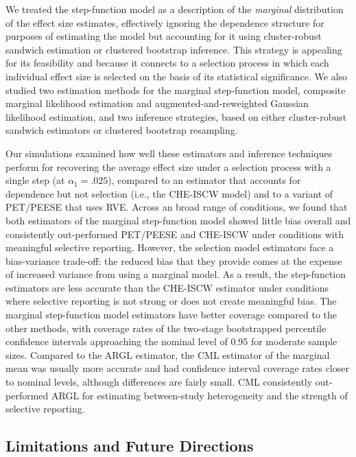 \documentclass[
  american,
  man, donotrepeattitle,floatsintext]{apa7}
\begin{document}
We treated the step-function model as a description of the \emph{marginal} distribution of the effect size estimates, effectively ignoring the dependence structure for purposes of estimating the model but accounting for it using cluster-robust sandwich estimation or clustered bootstrap inference.
This strategy is appealing for its feasibility and because it connects to a selection process in which each individual effect size is selected on the basis of its statistical significance.
We also studied two estimation methods for the marginal step-function model, composite marginal likelihood estimation and augmented-and-reweighted Gaussian likelihood estimation, and two inference strategies, based on either cluster-robust sandwich estimators or clustered bootstrap resampling.

Our simulations examined how well these estimators and inference techniques perform for recovering the average effect size under a selection process with a single step (at \(\alpha_1 = .025\)), compared to an estimator that accounts for dependence but not selection (i.e., the CHE-ISCW model) and to a variant of PET/PEESE that uses RVE.
Across an broad range of conditions, we found that both estimators of the marginal step-function model showed little bias overall and consistently out-performed PET/PEESE and CHE-ISCW under conditions with meaningful selective reporting.
However, the selection model estimators face a bias-variance trade-off:
the reduced bias that they provide comes at the expense of increased variance from using a marginal model. As a result, the step-function estimators are less accurate than the CHE-ISCW estimator under conditions where selective reporting is not strong or does not create meaningful bias.
The marginal step-function model estimators have better coverage compared to the other methods, with coverage rates of the two-stage bootstrapped percentile confidence intervals approaching the nominal level of 0.95 for moderate sample sizes.
Compared to the ARGL estimator, the CML estimator of the marginal mean was usually more accurate and had confidence interval coverage rates closer to nominal levels, although differences are fairly small.
CML consistently out-performed ARGL for estimating between-study heterogeneity and the strength of selective reporting.

\subsection{Limitations and Future Directions}\label{limitations-and-future-directions}
\end{document}
